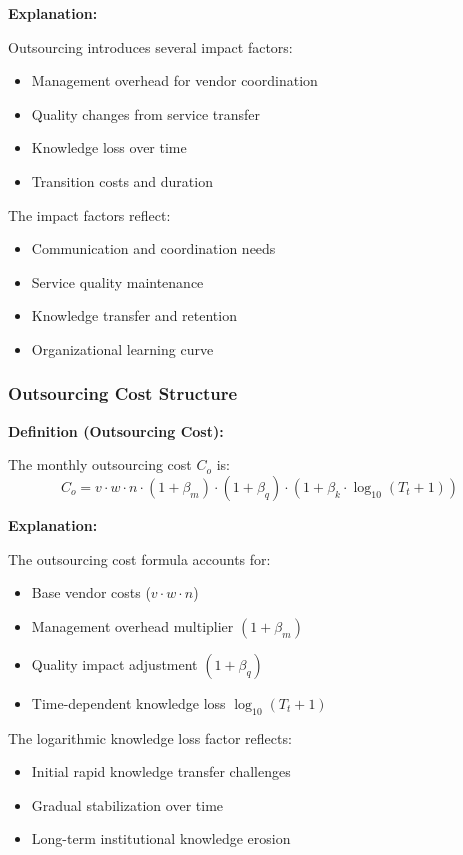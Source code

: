 \documentclass[12pt,a4paper]{article}
\newenvironment{definition}[1]
{\begin{mdframed}[style=definitionstyle]
\textbf{Definition (#1):}\par}
{\end{mdframed}}
\newenvironment{explanation}
{\begin{mdframed}[style=explanationstyle]
\textbf{Explanation:}\par}
{\end{mdframed}}
\begin{document}
\begin{explanation}
Outsourcing introduces several impact factors:
\begin{itemize}
    \item Management overhead for vendor coordination
    \item Quality changes from service transfer
    \item Knowledge loss over time
    \item Transition costs and duration
\end{itemize}

The impact factors reflect:
\begin{itemize}
    \item Communication and coordination needs
    \item Service quality maintenance
    \item Knowledge transfer and retention
    \item Organizational learning curve
\end{itemize}
\end{explanation}

\subsubsection{Outsourcing Cost Structure}
\begin{definition}{Outsourcing Cost}
The monthly outsourcing cost $C_o$ is:
\begin{equation}
    C_o = v \cdot w \cdot n \cdot (1 + \beta_m) \cdot (1 + \beta_q) \cdot (1 + \beta_k \cdot \log_{10}(T_t + 1))
\end{equation}
\end{definition}

\begin{explanation}
The outsourcing cost formula accounts for:
\begin{itemize}
    \item Base vendor costs ($v \cdot w \cdot n$)
    \item Management overhead multiplier $(1 + \beta_m)$
    \item Quality impact adjustment $(1 + \beta_q)$
    \item Time-dependent knowledge loss $\log_{10}(T_t + 1)$
\end{itemize}

The logarithmic knowledge loss factor reflects:
\begin{itemize}
    \item Initial rapid knowledge transfer challenges
    \item Gradual stabilization over time
    \item Long-term institutional knowledge erosion
\end{itemize}
\end{explanation}
\end{document}

